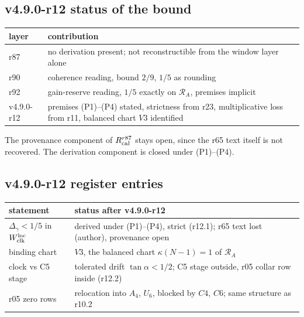 \subsection*{v4.9.0-r12 status of the bound}
\label{subsec:v490-r12-status}

\begin{center}
\small
\begin{tabular}{@{}>{\raggedright\arraybackslash}p{}>{\raggedright\arraybackslash}p{}@{}}
\toprule
layer & contribution\\
\midrule
r87 & no derivation present; not reconstructible from the window layer alone\\
r90 & coherence reading, bound \(2/9\), \(1/5\) as rounding\\
r92 & gain-reserve reading, \(1/5\) exactly on \(\mathcal R_A\), premises implicit\\
v4.9.0-r12 & premises (P1)--(P4) stated, strictness from r23, multiplicative loss from r11, balanced chart \(V3\) identified\\
\bottomrule
\end{tabular}
\end{center}
The provenance component of \(R_{\rm cal}^{r87}\) stays open, since the r65 text itself is not recovered.  The derivation
component is closed under (P1)--(P4).

\subsection*{v4.9.0-r12 register entries}
\label{subsec:v490-r12-register}

\begin{center}
\small
\begin{tabular}{@{}>{\raggedright\arraybackslash}p{}>{\raggedright\arraybackslash}p{}@{}}
\toprule
statement & status after v4.9.0-r12\\
\midrule
\(\Delta_\gamma<1/5\) in \(W_{\rm clk}^{\rm loc}\) & derived under (P1)--(P4), strict (r12.1); r65 text lost (author), provenance open\\
binding chart & \(V3\), the balanced chart \(\kappa(N-1)=1\) of \(\mathcal R_A\)\\
clock vs C5 stage & tolerated drift \(\tan\alpha<1/2\); C5 stage outside, r05 collar row inside (r12.2)\\
r05 zero rows & relocation into \(A_4\), \(U_6\), blocked by \(C4\), \(C6\); same structure as r10.2\\
\bottomrule
\end{tabular}
\end{center}

